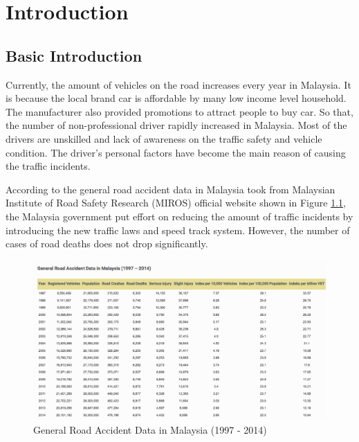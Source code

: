 \chapter{Introduction}
\section{Basic Introduction}
Currently, the amount of vehicles on the road increases every year in Malaysia.  
It is because the local brand car is affordable by many low income level household. The manufacturer also provided promotions to attract people to buy car. So that, the number of non-professional driver rapidly increased in Malaysia. Most of the drivers are unskilled and lack of awareness on the traffic safety and vehicle condition. The driver's personal factors have become the main reason of causing the traffic incidents.

According to the general road accident data in Malaysia took from Malaysian Institute of Road Safety Research (MIROS) official website shown in Figure \ref{fig:accident}, the Malaysia government put effort on reducing the amount of traffic incidents by introducing the new traffic laws and speed track system. However, the number of cases of road deaths does not drop significantly. 

\begin{figure}[hbt!]\centering
\includegraphics[width=.75\textwidth]{image/accident}
\caption{General Road Accident Data in Malaysia (1997 - 2014)}
\label{fig:accident}
\end{figure}


